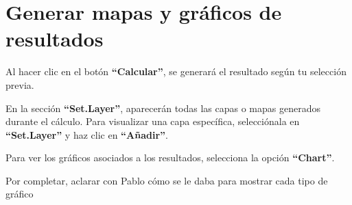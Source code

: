 \documentclass[
]{book}
\begin{document}
\chapter{Generar mapas y gráficos de resultados}\label{mapas-graficos}

Al hacer clic en el botón \textbf{``Calcular''}, se generará el resultado según tu selección previa.

En la sección \textbf{``Set.Layer''}, aparecerán todas las capas o mapas generados durante el cálculo. Para visualizar una capa específica, selecciónala en \textbf{``Set.Layer''} y haz clic en \textbf{``Añadir''}.

Para ver los gráficos asociados a los resultados, selecciona la opción \textbf{``Chart''}.

Por completar, aclarar con Pablo cómo se le daba para mostrar cada tipo de gráfico


\end{document}

